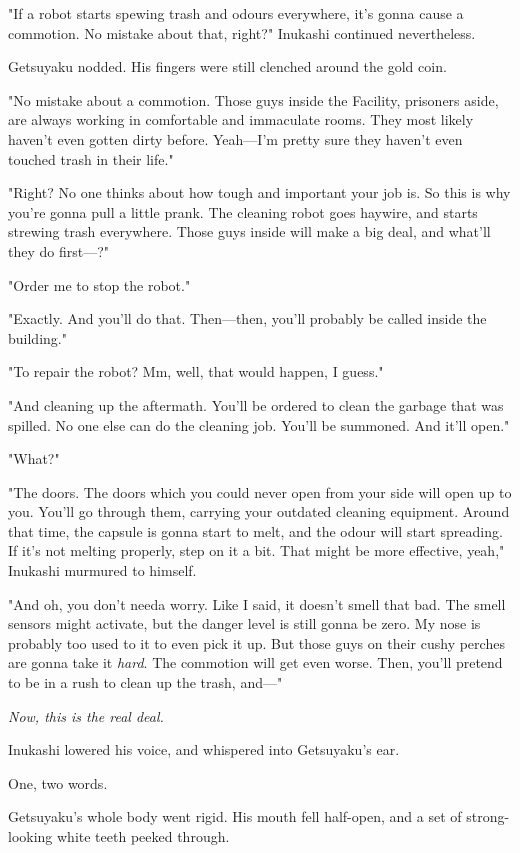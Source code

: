 "If a robot starts spewing trash and odours everywhere, it's gonna cause
a commotion. No mistake about that, right?" Inukashi continued
nevertheless.

Getsuyaku nodded. His fingers were still clenched around the gold coin.

"No mistake about a commotion. Those guys inside the Facility, prisoners
aside, are always working in comfortable and immaculate rooms. They most
likely haven't even gotten dirty before. Yeah---I'm pretty sure they
haven't even touched trash in their life."

"Right? No one thinks about how tough and important your job is. So this
is why you're gonna pull a little prank. The cleaning robot goes
haywire, and starts strewing trash everywhere. Those guys inside will
make a big deal, and what'll they do first---?"

"Order me to stop the robot."

"Exactly. And you'll do that. Then---then, you'll probably be called
inside the building."

"To repair the robot? Mm, well, that would happen, I guess."

"And cleaning up the aftermath. You'll be ordered to clean the garbage
that was spilled. No one else can do the cleaning job. You'll be
summoned. And it'll open."

"What?"

"The doors. The doors which you could never open from your side will
open up to you. You'll go through them, carrying your outdated cleaning
equipment. Around that time, the capsule is gonna start to melt, and the
odour will start spreading. If it's not melting properly, step on it a
bit. That might be more effective, yeah," Inukashi murmured to himself.

"And oh, you don't needa worry. Like I said, it doesn't smell that bad.
The smell sensors might activate, but the danger level is still gonna be
zero. My nose is probably too used to it to even pick it up. But those
guys on their cushy perches are gonna take it \emph{hard}. The commotion will
get even worse. Then, you'll pretend to be in a rush to clean up the
trash, and---"

\emph{Now, this is the real deal.}

Inukashi lowered his voice, and whispered into Getsuyaku's ear.

One, two words.

Getsuyaku's whole body went rigid. His mouth fell half-open, and a set
of strong-looking white teeth peeked through.

